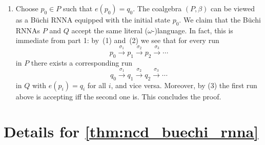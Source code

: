 \documentclass[10pt,a4paper]{amsart}
\newcommand{\scriptmidmid}{\hspace{0.2ex}{\rule[-0.1ex]{0.6pt}{1.1ex}}\hspace{0.2ex}}
\newcommand{\scriptnew}[1]{{\scriptmidmid}#1}
\numberwithin{equation}{section}
\newcommand{\xto}[1]{\xrightarrow{~#1~}}
\newcommand{\braket}[1]{\langle #1 \rangle}
\newcommand{\+}[1]{\mathcal{#1}\xspace}
\newcommand{\names}{\mathbb{A}}
\DeclareMathOperator{\supp}{\mathsf{supp}} %
\newcommand{\fresh}{\mathbin{\#}}
\theoremstyle{definition}
\begin{document}
\begin{enumerate}
    \smallskip\noindent Ad~(1). If $p\xto{\scriptnew a} r$ in $P$ we have
    $\braket{a} r\in \beta_r(p)$. Thus,
    $\braket{a} e(r) = [\names]e(\braket{a} r)\in \gamma_r(e(p))$
    by~\eqref{eq:coalg-morphism}. This shows $e(p)\xto{\scriptnew a} e(r)$ in
    $Q$.

    \smallskip\noindent Ad~(2). If $e(p)\xto{\scriptnew a} q$ in $Q$ we have
    $\braket{a}q\in \gamma_r(e(p))$. From \eqref{eq:coalg-morphism} it
    follows that there exists $b\in \names$ and $r\in P$ such that
    $\braket{b}r\in \beta_r(p)$ and $\braket{a}q = \braket{b}e(r)$. If
    $a=b$, this implies $p\xto{\scriptnew a}r$ in $P$ and $q=e(r)$, and we are
    done. If $a\neq b$, we have $a\fresh e(r)$ because
    $\supp(q)\setminus \{a\} = \supp(e(r))\setminus \{b\}$. Since $e$
    is $\supp$-nondecreasing, this implies $a\fresh r$. Therefore
    $\braket{a}(a\, b)r = \braket{b} r \in \beta_r(p)$,
    i.e.~$p\xto{\scriptnew a}(a\, b)r$ in $P$. Moreover, we have
    $\braket{a}q = \braket{b}e(r) = \braket{a}(a\, b)e(r) =
    \braket{a}e((a\,b)r)$ and therefore $e((a\,b)r)=q$, as required.

  \item Choose $p_0\in P$ such that $e(p_0)=q_0$. The coalgebra
    $(P,\beta)$ can be viewed as a Büchi RNNA equipped with the initial
    state $p_0$. We claim that the Büchi RNNAs $P$ and $Q$ accept the same
    literal ($\omega$-)language. In fact, this is immediate from part
    1: by~(1) and~(2) we see that for every run
    \[
      p_0 \xto{\sigma_1} p_1 \xto{\sigma_2} p_2 \xto{\sigma_3} \cdots
    \]
    in $P$ there exists a corresponding run
    \[
      q_0 \xto{\sigma_1} q_1 \xto{\sigma_2} q_2 \xto{\sigma_3} \cdots
    \]
    in $Q$ with $e(p_i)=q_i$ for all $i$, and vice versa. Moreover, by
    (3) the first run above is accepting iff the second one
    is. This concludes the proof. \qedhere
  \end{enumerate}

\section*{Details for \autoref{thm:ncd_buechi_rnna}}
\end{document}
